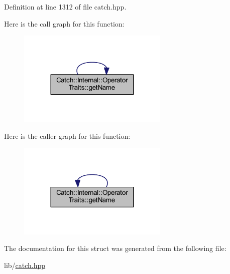 Definition at line 1312 of file catch.\+hpp.

Here is the call graph for this function\+:\nopagebreak
\begin{figure}[H]
\begin{center}
\leavevmode
\includegraphics[width=203pt]{struct_catch_1_1_internal_1_1_operator_traits_ac6d08082ea33348d42bc4ccbd6d07671_cgraph}
\end{center}
\end{figure}
Here is the caller graph for this function\+:\nopagebreak
\begin{figure}[H]
\begin{center}
\leavevmode
\includegraphics[width=203pt]{struct_catch_1_1_internal_1_1_operator_traits_ac6d08082ea33348d42bc4ccbd6d07671_icgraph}
\end{center}
\end{figure}


The documentation for this struct was generated from the following file\+:\begin{DoxyCompactItemize}
\item 
lib/\hyperlink{catch_8hpp}{catch.\+hpp}\end{DoxyCompactItemize}
